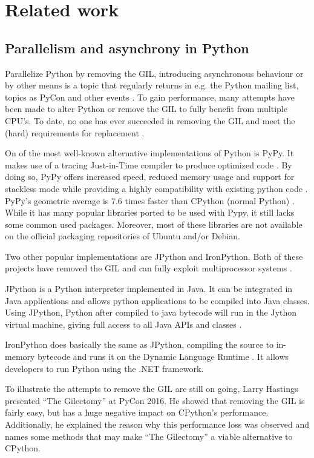 \chapter{Related work}

\section{Parallelism and asynchrony in Python}
\label{sct:parallelism_and_asynchrony_in_python}
Parallelize Python by removing the GIL, introducing asynchronous behaviour or by other means is a topic that regularly returns in e.g. the Python mailing list, topics as PyCon and other events \cite{python2015global}.
To gain performance, many attempts have been made to alter Python or remove the GIL to fully benefit from multiple CPU's.
To date, no one has ever succeeded in removing the GIL and meet the (hard) requirements for replacement \cite{python2015global}.

On of the most well-known alternative implementations of Python is PyPy.
It makes use of a tracing Just-in-Time compiler to produce optimized code \cite{bolz2009tracing}.
By doing so, PyPy offers increased speed, reduced memory usage and support for stackless mode while providing a highly compatibility with existing python code \cite{pypy2016pypy}.
PyPy's geometric average is 7.6 times faster than CPython (normal Python) \cite{pypy2016speed}.
While it has many popular libraries ported to be used with Pypy, it still lacks some common used packages.
Moreover, most of these libraries are not available on the official packaging repositories of Ubuntu and/or Debian.

Two other popular implementations are JPython and IronPython.
Both of these projects have removed the GIL and can fully exploit multiprocessor systems \cite{python2015global}.

JPython is a Python interpreter implemented in Java. It can be integrated in Java applications and allows python applications to be compiled into Java classes.
Using JPython, Python after compiled to java bytecode will run in the Jython virtual machine, giving full access to all Java APIs and classes \cite{jython2016why}.

IronPython does basically the same as JPython, compiling the source to in-memory bytecode and runs it on the Dynamic Language Runtime \cite{ironpython2014}.
It allows developers to run Python using the .NET framework.

To illustrate the attempts to remove the GIL are still on going, Larry Hastings presented ``The Gilectomy'' at PyCon 2016.
He showed that removing the GIL is fairly easy, but has a huge negative impact on CPython's performance.
Additionally, he explained the reason why this performance loss was observed and names some methods that may make ``The Gilectomy'' a viable alternative to CPython.\\

